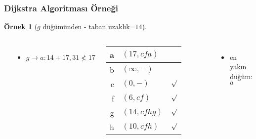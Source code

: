 \documentclass[dvipsnames]{beamer}
\theoremstyle{definition}
\theoremstyle{example}
\newtheorem{ornek}[theorem]{Örnek}
\theoremstyle{plain}
\begin{document}
\begin{frame}
  \frametitle{Dijkstra Algoritması Örneği}

  \begin{ornek}[$g$ düğümünden - taban uzaklık=$14$]
    \begin{columns}
      \begin{center}
      \end{center}

      \begin{itemize}
        \item $g \rightarrow a: 14+17, 31 \nless 17$
      \end{itemize}

      \pause
      \begin{table}
        \begin{tabular}{r|l|c}
          a & $(17,cfa)$   & \\\hline
          b & $(\infty,-)$ & \\\hline
          c & $(0,-)$      & $\surd$ \\\hline
          f & $(6,cf)$     & $\surd$ \\\hline
          g & $(14,cfhg)$  & $\surd$ \\\hline
          h & $(10,cfh)$   & $\surd$
        \end{tabular}
      \end{table}

      \pause
      \begin{itemize}
        \item en yakın düğüm: $a$
      \end{itemize}
    \end{columns}
  \end{ornek}
\end{frame}
\end{document}
